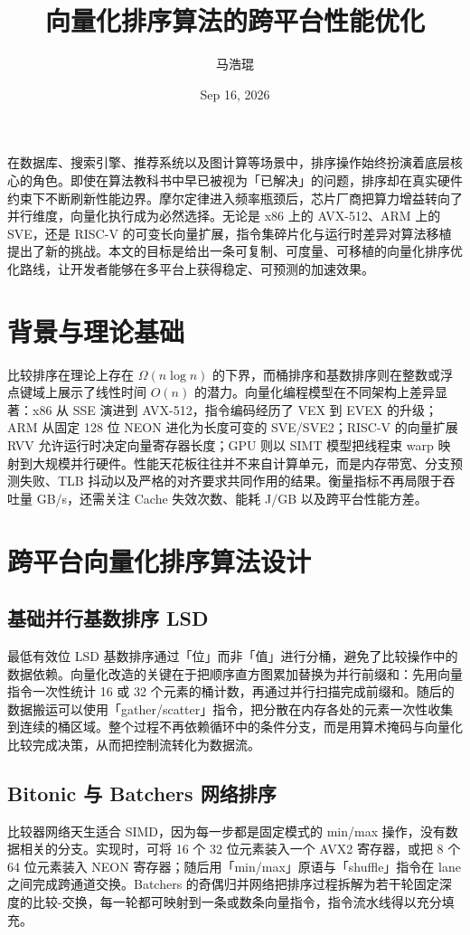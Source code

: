 \title{向量化排序算法的跨平台性能优化}
\author{马浩琨}
\date{Sep 16, 2026}
\maketitle
在数据库、搜索引擎、推荐系统以及图计算等场景中，排序操作始终扮演着底层核心的角色。即使在算法教科书中早已被视为「已解决」的问题，排序却在真实硬件约束下不断刷新性能边界。摩尔定律进入频率瓶颈后，芯片厂商把算力增益转向了并行维度，向量化执行成为必然选择。无论是 x86 上的 AVX-512、ARM 上的 SVE，还是 RISC-V 的可变长向量扩展，指令集碎片化与运行时差异对算法移植提出了新的挑战。本文的目标是给出一条可复制、可度量、可移植的向量化排序优化路线，让开发者能够在多平台上获得稳定、可预测的加速效果。\par
\chapter{背景与理论基础}
比较排序在理论上存在 $\Omega(n \log n)$ 的下界，而桶排序和基数排序则在整数或浮点键域上展示了线性时间 $O(n)$ 的潜力。向量化编程模型在不同架构上差异显著：x86 从 SSE 演进到 AVX-512，指令编码经历了 VEX 到 EVEX 的升级；ARM 从固定 128 位 NEON 进化为长度可变的 SVE/SVE2；RISC-V 的向量扩展 RVV 允许运行时决定向量寄存器长度；GPU 则以 SIMT 模型把线程束 warp 映射到大规模并行硬件。性能天花板往往并不来自计算单元，而是内存带宽、分支预测失败、TLB 抖动以及严格的对齐要求共同作用的结果。衡量指标不再局限于吞吐量 GB/s，还需关注 Cache 失效次数、能耗 J/GB 以及跨平台性能方差。\par
\chapter{跨平台向量化排序算法设计}
\section{基础并行基数排序 LSD}
最低有效位 LSD 基数排序通过「位」而非「值」进行分桶，避免了比较操作中的数据依赖。向量化改造的关键在于把顺序直方图累加替换为并行前缀和：先用向量指令一次性统计 16 或 32 个元素的桶计数，再通过并行扫描完成前缀和。随后的数据搬运可以使用「gather/scatter」指令，把分散在内存各处的元素一次性收集到连续的桶区域。整个过程不再依赖循环中的条件分支，而是用算术掩码与向量化比较完成决策，从而把控制流转化为数据流。\par
\section{Bitonic 与 Batchers 网络排序}
比较器网络天生适合 SIMD，因为每一步都是固定模式的 min/max 操作，没有数据相关的分支。实现时，可将 16 个 32 位元素装入一个 AVX2 寄存器，或把 8 个 64 位元素装入 NEON 寄存器；随后用「min/max」原语与「shuffle」指令在 lane 之间完成跨通道交换。Batchers 的奇偶归并网络把排序过程拆解为若干轮固定深度的比较-交换，每一轮都可映射到一条或数条向量指令，指令流水线得以充分填充。\par
